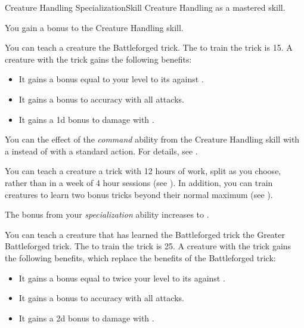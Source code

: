     \begin{feat}{Creature Handling Specialization}{Skill}
        \featpre Creature Handling as a mastered skill.

         You gain a  bonus to the Creature Handling skill.

         You can teach a creature the Battleforged trick.
        The  to train the trick is 15.
        A creature with the trick gains the following benefits:
        \begin{itemize}
            \item It gains a bonus equal to your level to its  against .
            \item It gains a  bonus to accuracy with all attacks.
            \item It gains a \plus1d bonus to damage with .
        \end{itemize}

         You can  the effect of the \textit{command} ability from the Creature Handling skill with a  instead of with a standard action.
        For details, see .

         You can teach a creature a trick with 12 hours of work, split as you choose, rather than in a week of 4 hour sessions (see ).
        In addition, you can train creatures to learn two bonus tricks beyond their normal maximum (see ).

         The bonus from your \textit{specialization} ability increases to .

         You can teach a creature that has learned the Battleforged trick the Greater Battleforged trick.
        The  to train the trick is 25.
        A creature with the trick gains the following benefits, which replace the benefits of the Battleforged trick:
        \begin{itemize}
            \item It gains a bonus equal to twice your level to its  against .
            \item It gains a  bonus to accuracy with all attacks.
            \item It gains a \plus2d bonus to damage with .
        \end{itemize}


\end{feat}
